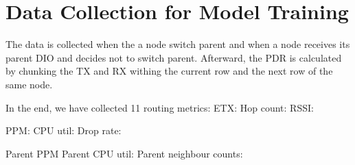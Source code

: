 \section{Data Collection for Model Training}
The data is collected when the a node switch parent and when a node receives its parent DIO and decides not to switch parent.
Afterward, the PDR is calculated by chunking the TX and RX withing the current row and the next row of the same node.

In the end, we have collected 11 routing metrics:
ETX:
Hop count:
RSSI:

PPM:
CPU util:
Drop rate:

Parent PPM
Parent CPU util:
Parent neighbour counts:
